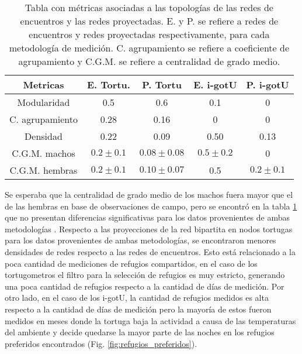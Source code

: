 \begin{table}[ht]
    \centering
    \begin{tabular}{|c|c|c|c|c|}
    \hline
    Metricas          & E. Tortu.   & P. Tortu      & E. i-gotU   & P. i-gotU    \\ \hline
    Modularidad       & 0.5         & 0.6           & 0.1        & 0            \\ \hline
    C. agrupamiento & 0.28        & 0.16          & 0           & 0            \\ \hline
    Densidad          & 0.22        & 0.09          & 0.50         & 0.13          \\ \hline
    C.G.M. machos     & $0.2\pm0.1$ & $0.08\pm0.08$ & $0.5\pm0.2$ & 0            \\ \hline
    C.G.M. hembras    & $0.2\pm0.1$ & $0.10\pm0.07$ & 0.5         & $0.2\pm0.1 $ \\ \hline
    \end{tabular}
    \caption[Tabla con métricas asociadas a las tipologías de las redes de encuentros y las redes proyectadas.]{Tabla con métricas asociadas a las topologías de las redes de encuentros y las redes proyectadas. E. y P. se refiere a redes de encuentros y redes proyectadas respectivamente, para cada metodología de medición. C. agrupamiento se refiere a coeficiente de agrupamiento y C.G.M. se refiere a centralidad de grado medio.}
    \label{tab:metricas_topologia_redes}
\end{table}
Se esperaba que la centralidad de grado medio de los machos fuera mayor que el de las hembras en base de observaciones de campo, pero se encontró en la tabla \ref{tab:metricas_topologia_redes} que no presentan diferencias significativas para los datos provenientes de ambas metodologías \cite{Erika}. Respecto a las proyecciones de la red bipartita en nodos tortugas para los datos provenientes de ambas metodologías, se encontraron menores densidades de redes respecto a las redes de encuentros. Esto está relacionado a la poca cantidad de mediciones de refugios compartidos, en el caso de los tortugometros el filtro para la selección de refugios es muy estricto, generando una poca cantidad de refugios respecto a la cantidad de días de medición. Por otro lado, en el caso de los i-gotU, la cantidad de refugios medidos es alta respecto a la cantidad de días de medición pero la mayoría de estos fueron medidos en meses donde la tortuga baja la actividad a causa de las temperaturas del ambiente y decide quedarse la mayor parte de las noches en los refugios preferidos encontrados (Fig. \ref{fig:refugios_preferidos}).

